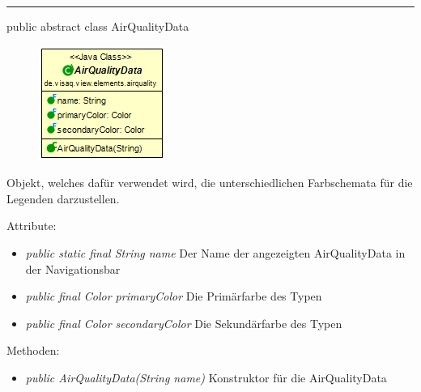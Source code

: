 
\rule{\textwidth}{0.4pt}
public abstract class AirQualityData

\begin{minipage}{0.3\textwidth}
    \begin{figure}[H]
        \includegraphics[scale = 0.6]{media/frontend/view/de.view.elements.airquality/AirQualityData_Class.png}
    \end{figure}
    \end{minipage} \hfill
    \begin{minipage}{0.6\textwidth}
Objekt, welches dafür verwendet wird, die unterschiedlichen Farbschemata für die Legenden darzustellen.
\end{minipage}

Attribute:
\begin{itemize}
    \item \emph{public static final String name} Der Name der angezeigten AirQualityData in der Navigationsbar
    \item \emph{public final Color primaryColor} Die Primärfarbe des Typen
	\item \emph{public final Color secondaryColor} Die Sekundärfarbe des Typen
\end{itemize}
Methoden:
\begin{itemize}
    \item \emph{public AirQualityData(String name)} Konstruktor für die AirQualityData
\end{itemize}
